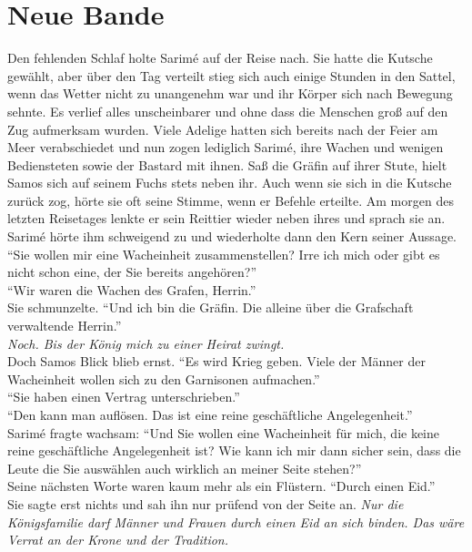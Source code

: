 
\chapter{Neue Bande}

Den fehlenden Schlaf holte Sarimé auf der Reise nach. Sie hatte die Kutsche gewählt, aber über den 
Tag verteilt stieg sich auch einige Stunden in den Sattel, wenn das Wetter nicht zu unangenehm war 
und ihr Körper sich nach Bewegung sehnte. Es verlief alles unscheinbarer und ohne dass die Menschen 
groß auf den Zug aufmerksam wurden. Viele Adelige hatten sich bereits nach der Feier am Meer 
verabschiedet und nun zogen lediglich Sarimé, ihre Wachen und wenigen Bediensteten sowie der Bastard 
mit ihnen. Saß die Gräfin auf ihrer Stute, hielt Samos sich auf seinem Fuchs stets neben ihr. Auch 
wenn sie sich in die Kutsche zurück zog, hörte sie oft seine Stimme, wenn er Befehle erteilte. Am 
morgen des letzten Reisetages lenkte er sein Reittier wieder neben ihres und sprach sie an.
Sarimé hörte ihm schweigend zu und wiederholte dann den Kern seiner Aussage. \\
``Sie wollen mir eine Wacheinheit zusammenstellen? Irre ich mich oder gibt es nicht schon eine, der 
Sie bereits angehören?''\\
``Wir waren die Wachen des Grafen, Herrin.''\\
Sie schmunzelte. ``Und ich bin die Gräfin. Die alleine über die Grafschaft verwaltende Herrin.''\\
\textit{Noch. Bis der König mich zu einer Heirat zwingt.}\\
Doch Samos Blick blieb ernst. ``Es wird Krieg geben. Viele der Männer der Wacheinheit wollen sich 
zu 
den Garnisonen aufmachen.''\\
``Sie haben einen Vertrag unterschrieben.''\\
``Den kann man auflösen. Das ist eine reine geschäftliche Angelegenheit.''\\
Sarimé fragte wachsam: ``Und Sie wollen eine Wacheinheit für mich, die keine reine geschäftliche 
Angelegenheit ist? Wie kann ich mir dann sicher sein, dass die Leute die Sie auswählen auch 
wirklich 
an meiner Seite stehen?''\\
Seine nächsten Worte waren kaum mehr als ein Flüstern. ``Durch einen Eid.''\\
Sie sagte erst nichts und sah ihn nur prüfend von der Seite an. \textit{Nur die Königsfamilie darf 
Männer und Frauen durch einen Eid an sich binden. Das wäre Verrat an der Krone und der Tradition.}\\

